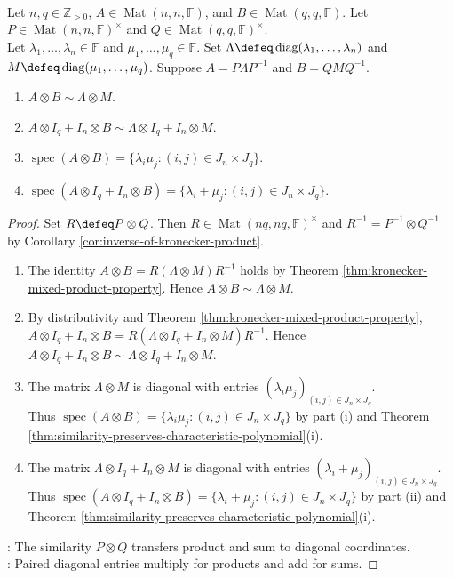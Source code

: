 \begin{proposition} \label{prop:kronecker-product-and-sum-diagonalizable-spectra} \\
Let $n,q\in\mathbb{Z}_{>0}$, $A\in\operatorname{Mat}(n,n,\mathbb{F})$, and $B\in\operatorname{Mat}(q,q,\mathbb{F})$. Let $P\in\operatorname{Mat}(n,n,\mathbb{F})^\times$ and $Q\in\operatorname{Mat}(q,q,\mathbb{F})^\times$.\\
Let $\lambda_1,\ldots,\lambda_n\in\mathbb{F}$ and $\mu_1,\ldots,\mu_q\in\mathbb{F}$. Set $\Lambda\defeq\operatorname{diag}(\lambda_1,\ldots,\lambda_n)$ and $M\defeq\operatorname{diag}(\mu_1,\ldots,\mu_q)$. Suppose $A=P\Lambda P^{-1}$ and $B=QMQ^{-1}$.
\begin{enumerate}[label=(\roman*)]
\setlength{\itemsep}{0pt}
\item $A\otimes B\sim\Lambda\otimes M$.
\item $A\otimes I_q+I_n\otimes B\sim\Lambda\otimes I_q+I_n\otimes M$.
\item $\operatorname{spec}(A\otimes B)=\{\lambda_i\mu_j:(i,j)\in J_n\times J_q\}$.
\item $\operatorname{spec}(A\otimes I_q+I_n\otimes B)=\{\lambda_i+\mu_j:(i,j)\in J_n\times J_q\}$.
\end{enumerate}
\begin{proof}
Set $R\defeq P\otimes Q$. Then $R\in\operatorname{Mat}(nq,nq,\mathbb{F})^\times$ and $R^{-1}=P^{-1}\otimes Q^{-1}$ by Corollary \ref{cor:inverse-of-kronecker-product}.
\begin{enumerate}[label=(\roman*)]
\setlength{\itemsep}{0pt}
\item The identity $A\otimes B=R(\Lambda\otimes M)R^{-1}$ holds by Theorem \ref{thm:kronecker-mixed-product-property}. Hence $A\otimes B\sim\Lambda\otimes M$.
\item By distributivity and Theorem \ref{thm:kronecker-mixed-product-property}, $A\otimes I_q+I_n\otimes B=R(\Lambda\otimes I_q+I_n\otimes M)R^{-1}$. Hence $A\otimes I_q+I_n\otimes B\sim\Lambda\otimes I_q+I_n\otimes M$.
\item The matrix $\Lambda\otimes M$ is diagonal with entries $(\lambda_i\mu_j)_{(i,j)\in J_n\times J_q}$.\\
Thus $\operatorname{spec}(A\otimes B)=\{\lambda_i\mu_j:(i,j)\in J_n\times J_q\}$ by part (i) and Theorem \ref{thm:similarity-preserves-characteristic-polynomial}(i).
\item The matrix $\Lambda\otimes I_q+I_n\otimes M$ is diagonal with entries $(\lambda_i+\mu_j)_{(i,j)\in J_n\times J_q}$.\\
Thus $\operatorname{spec}(A\otimes I_q+I_n\otimes B)=\{\lambda_i+\mu_j:(i,j)\in J_n\times J_q\}$ by part (ii) and Theorem \ref{thm:similarity-preserves-characteristic-polynomial}(i).
\end{enumerate}
: The similarity $P\otimes Q$ transfers product and sum to diagonal coordinates.\\
: Paired diagonal entries multiply for products and add for sums.
\end{proof}
\end{proposition}

